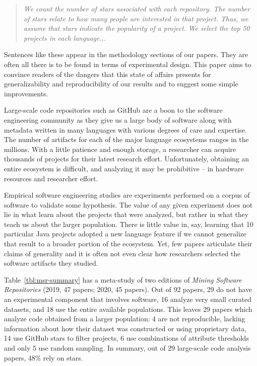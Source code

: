 \documentclass[sigconf,review,anonymous]{acmart}
\newcommand{\gh}{{GitHub}\xspace}
\begin{document}
\begin{quote}\small\it
We count the number of stars associated with each repository. The number of
stars relate to how many people are interested in that project. Thus, we assume
that stars indicate the popularity of a project. We select the top 50 projects
in each language...
\end{quote}

\noindent
Sentences like these appear in the methodology sections of our papers. They are
often all there is to be found in terms of experimental design. This paper aims
to convince readers of the dangers that this state of affairs presents for
generalizability and reproducibility of our results and to suggest some simple
improvements.

Large-scale code repositories such as \gh are a boon to the software
engineering community as they give us a large body of software along with
metadata written in many languages with various degrees of care and expertise.
The number of artifacts for each of the major language ecosystems ranges in the
millions. With a little patience and enough storage, a researcher can acquire
thousands of projects for their latest research effort. Unfortunately, obtaining
an entire ecosystem is difficult, and analyzing it may be prohibitive -- in
hardware resources and researcher effort.

Empirical software engineering studies are experiments performed on a corpus of
software to validate some hypothesis. The value of any given experiment does not
lie in what learn about the projects that were analyzed, but rather in what they
teach us about the larger population. There is little value in, say, learning
that 10 particular Java projects adopted a new language feature if we cannot
generalize that result to a broader portion of the ecosystem. Yet, few papers
articulate their claims of generality and it is often not even clear how
researchers selected the software artifacts they studied.

Table~\ref{tbl:msr-summary} has a meta-study of two editions of \emph{Mining
Software Repositories} (2019, 47 papers; 2020, 45 papers). Out of 92 papers, 29
do not have an experimental component that involves software, 16 analyze very
small curated datasets, and 18 use the entire available populations. This leaves
29 papers which analyze code obtained from a larger population: 4 are not
reproducible, lacking information about how their dataset was constructed or
using proprietary data, 14 use \gh stars to filter projects, 6 use
combinations of attribute thresholds and only 5 use random sampling. In
summary, out of 29 large-scale code analysis papers, 48\% rely on stars.
\end{document}
